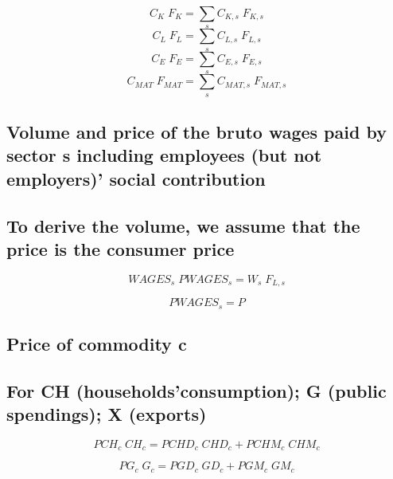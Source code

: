 \documentclass[12pt]{article}
\numberwithin{equation}{section}
\begin{document}
\begin{dmath}
C_{K} \; F_{K} = \sum_{s} C_{K, s} \; F_{K, s}
\end{dmath}
\begin{dmath}
C_{L} \; F_{L} = \sum_{s} C_{L, s} \; F_{L, s}
\end{dmath}
\begin{dmath}
C_{E} \; F_{E} = \sum_{s} C_{E, s} \; F_{E, s}
\end{dmath}
\begin{dmath}
C_{MAT} \; F_{MAT} = \sum_{s} C_{MAT, s} \; F_{MAT, s}
\end{dmath}





\subsection{Volume and price of the bruto wages paid by sector s including employees (but not employers)' social contribution}




\subsection{To derive the volume, we assume that the price is the consumer price}


\begin{dmath}
WAGES_{s} \; PWAGES_{s} = W_{s} \; F_{L, s}
\end{dmath}

\begin{dmath}
PWAGES_{s} = P
\end{dmath}



\subsection{Price of commodity c}




\subsection{For CH (households'consumption); G (public spendings); X (exports)}


\begin{dmath}
PCH_{c} \; CH_{c} = PCHD_{c} \; CHD_{c} + PCHM_{c} \; CHM_{c}
\end{dmath}

\begin{dmath}
PG_{c} \; G_{c} = PGD_{c} \; GD_{c} + PGM_{c} \; GM_{c}
\end{dmath}
\end{document}
